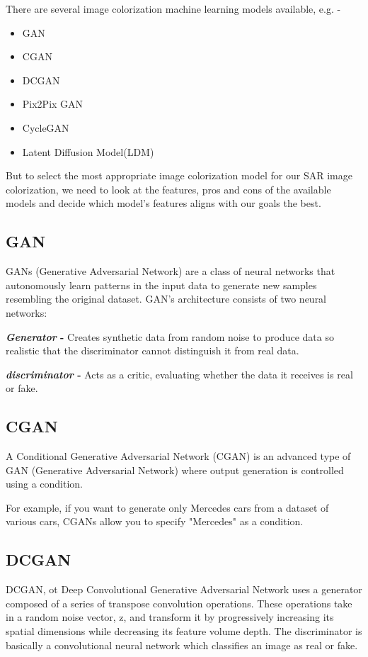 There are several image colorization machine learning models available, e.g. - 
\begin{itemize}
    \item GAN
    \item CGAN
    \item DCGAN
    \item Pix2Pix GAN
    \item CycleGAN
    \item Latent Diffusion Model(LDM)
\end{itemize}

But to select the most appropriate image colorization model for our SAR image colorization, we need to look at the features, pros and cons of the available models and decide which model's features aligns with our goals the best.

\subsection{GAN}
GANs (Generative Adversarial Network) are a class of neural networks that autonomously learn patterns in the input data to generate new samples resembling the original dataset.
GAN's architecture consists of two neural networks:\par
    \textbf{\textit{Generator} -} Creates synthetic data from random noise to produce data so realistic that the discriminator cannot distinguish it from real data.\par
    \textbf{\textit{discriminator} -} Acts as a critic, evaluating whether the data it receives is real or fake.

\subsection{CGAN}
A Conditional Generative Adversarial Network (CGAN) is an advanced type of GAN (Generative Adversarial Network) where output generation is controlled using a condition.\par
For example, if you want to generate only Mercedes cars from a dataset of various cars, CGANs allow you to specify "Mercedes" as a condition.

\subsection{DCGAN}
DCGAN, ot Deep Convolutional Generative Adversarial Network uses a generator composed of a series of transpose convolution operations. These operations take in a random noise vector, z, and transform it by progressively increasing its spatial dimensions while decreasing its feature volume depth. The discriminator is basically a convolutional neural network which classifies an image as real or fake.

